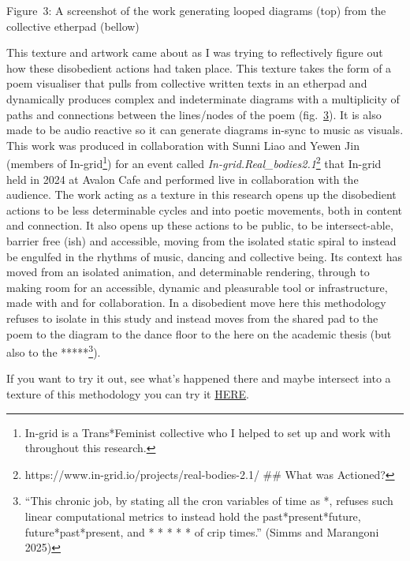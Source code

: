 Figure~3: A screenshot of the work generating looped diagrams (top) from
the collective etherpad (bellow)

This texture and artwork came about as I was trying to reflectively
figure out how these disobedient actions had taken place. This texture
takes the form of a poem visualiser that pulls from collective written
texts in an etherpad and dynamically produces complex and indeterminate
diagrams with a multiplicity of paths and connections between the
lines/nodes of the poem (fig.~\protect\hyperlink{fig:loops}{3}). It is
also made to be audio reactive so it can generate diagrams in-sync to
music as visuals. This work was produced in collaboration with Sunni
Liao and Yewen Jin (members of In-grid\footnote{In-grid is a
  Trans*Feminist collective who I helped to set up and work with
  throughout this research.}) for an event called
\emph{In-grid.Real\_bodies2.1}\footnote{https://www.in-grid.io/projects/real-bodies-2.1/
  \#\# What was Actioned?} that In-grid held in 2024 at Avalon Cafe and
performed live in collaboration with the audience. The work acting as a
texture in this research opens up the disobedient actions to be less
determinable cycles and into poetic movements, both in content and
connection. It also opens up these actions to be public, to be
intersect-able, barrier free (ish) and accessible, moving from the
isolated static spiral to instead be engulfed in the rhythms of music,
dancing and collective being. Its context has moved from an isolated
animation, and determinable rendering, through to making room for an
accessible, dynamic and pleasurable tool or infrastructure, made with
and for collaboration. In a disobedient move here this methodology
refuses to isolate in this study and instead moves from the shared pad
to the poem to the diagram to the dance floor to the here on the
academic thesis (but also to the *****\footnote{``This chronic job, by
  stating all the cron variables of time as *, refuses such linear
  computational metrics to instead hold the past*present*future,
  future*past*present, and * * * * * of crip times.'' (Simms and
  Marangoni 2025)}).

If you want to try it out, see what's happened there and maybe intersect
into a texture of this methodology you can try it
\href{https://georgie-png.github.io/etherpad-vis/}{HERE}.

